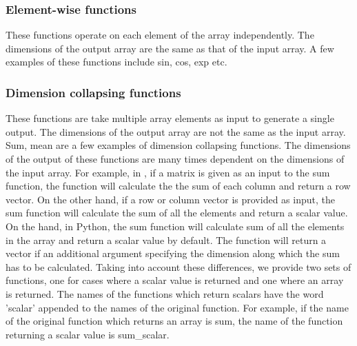 \subsubsection{Element-wise functions}
These functions operate on each element of the array independently. The dimensions of the output array are the same as that of the input array. A few examples of these functions include sin, cos, exp etc. 
\subsubsection{Dimension collapsing functions}
These functions are take multiple array elements as input to generate a single output. The dimensions of the output array are not the same as the input array. Sum, mean are a few examples of dimension collapsing functions. The dimensions of the output of these functions are many times dependent on the dimensions of the input array. For example, in \matlab, if a matrix is given as an input to the sum function, the function will calculate the the sum of each column and return a row vector. On the other hand, if a row or column vector is provided as input, the sum function will calculate the sum of all the elements and return a scalar value. On the hand, in Python, the sum function will calculate sum of all the elements in the array and return a scalar value by default. The function will return a vector if an additional argument specifying the dimension along which the sum has to be calculated. Taking into account these differences, we provide two sets of functions, one for cases where a scalar value is returned and one where an array is returned. The names of the functions which return scalars have the word 'scalar' appended to the names of the original function. For example, if the name of the original function  which returns an array is sum, the name of the function returning a scalar value is sum\_scalar.
